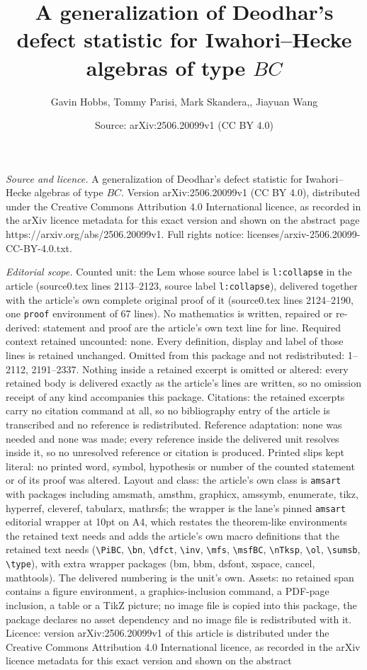 \documentclass[10pt,a4paper]{amsart}
\title[A generalization of Deodhar's defect statistic for Iwahori--]{A generalization of Deodhar's defect statistic for Iwahori--Hecke algebras of type $BC$}
\author{Gavin Hobbs, Tommy Parisi, Mark Skandera,, Jiayuan Wang}
\date{Source: arXiv:2506.20099v1 (CC BY 4.0)}
\begin{document}
\maketitle

\noindent\emph{Source and licence.} A generalization of Deodhar's defect statistic for Iwahori--Hecke algebras of type $BC$. Version arXiv:2506.20099v1 (CC BY 4.0), distributed under the Creative Commons Attribution 4.0 International licence, as recorded in the arXiv licence metadata for this exact version and shown on the abstract page https://arxiv.org/abs/2506.20099v1. Full rights notice: licenses/arxiv-2506.20099-CC-BY-4.0.txt.\par\smallskip

\noindent\textit{Editorial scope.} Counted unit: the Lem whose source label is \texttt{l:collapse} in the article (source0.tex lines 2113--2123, source label \texttt{l:collapse}), delivered together with the article's own complete original proof of it (source0.tex lines 2124--2190, one \texttt{proof} environment of 67 lines). No mathematics is written, repaired or re-derived: statement and proof are the article's own text line for line. Required context retained uncounted: none. Every definition, display and label of those lines is retained unchanged. Omitted from this package and not redistributed: 1--2112, 2191--2337. Nothing inside a retained excerpt is omitted or altered: every retained body is delivered exactly as the article's lines are written, so no omission receipt of any kind accompanies this package. Citations: the retained excerpts carry no citation command at all, so no bibliography entry of the article is transcribed and no reference is redistributed. Reference adaptation: none was needed and none was made; every reference inside the delivered unit resolves inside it, so no unresolved reference or citation is produced. Printed slips kept literal: no printed word, symbol, hypothesis or number of the counted statement or of its proof was altered. Layout and class: the article's own class is \texttt{amsart} with packages including amsmath, amsthm, graphicx, amssymb, enumerate, tikz, hyperref, cleveref, tabularx, mathrsfs; the wrapper is the lane's pinned \texttt{amsart} editorial wrapper at 10pt on A4, which restates the theorem-like environments the retained text needs and adds the article's own macro definitions that the retained text needs (\texttt{\textbackslash PiBC}, \texttt{\textbackslash bn}, \texttt{\textbackslash dfct}, \texttt{\textbackslash inv}, \texttt{\textbackslash mfs}, \texttt{\textbackslash msfBC}, \texttt{\textbackslash nTksp}, \texttt{\textbackslash ol}, \texttt{\textbackslash sumsb}, \texttt{\textbackslash type}), with extra wrapper packages (bm, bbm, dsfont, xspace, cancel, mathtools). The delivered numbering is the unit's own. Assets: no retained span contains a figure environment, a graphics-inclusion command, a PDF-page inclusion, a table or a TikZ picture; no image file is copied into this package, the package declares no asset dependency and no image file is redistributed with it. Licence: version arXiv:2506.20099v1 of this article is distributed under the Creative Commons Attribution 4.0 International licence, as recorded in the arXiv licence metadata for this exact version and shown on the abstract 
\end{document}
